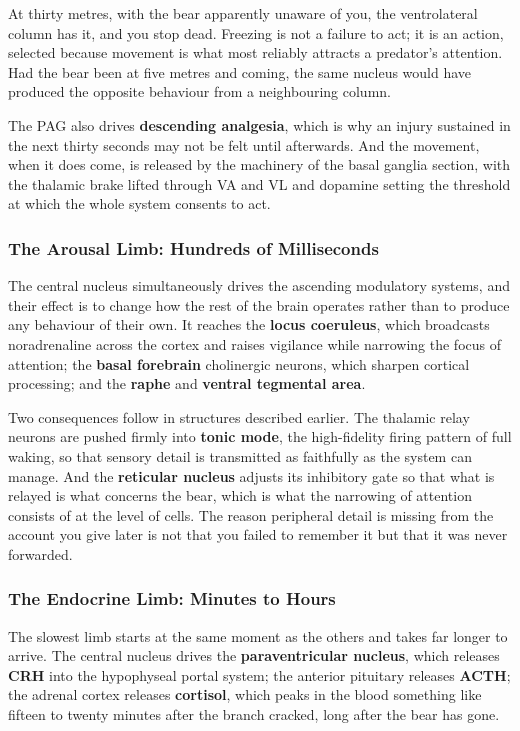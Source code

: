 \documentclass[11pt]{article}
\begin{document}
At thirty metres, with the bear apparently unaware of you, the ventrolateral column has it, and you stop dead. Freezing is not a failure to act; it is an action, selected because movement is what most reliably attracts a predator's attention. Had the bear been at five metres and coming, the same nucleus would have produced the opposite behaviour from a neighbouring column.

The PAG also drives \textbf{descending analgesia}, which is why an injury sustained in the next thirty seconds may not be felt until afterwards. And the movement, when it does come, is released by the machinery of the basal ganglia section, with the thalamic brake lifted through VA and VL and dopamine setting the threshold at which the whole system consents to act.

\subsubsection{The Arousal Limb: Hundreds of Milliseconds}

The central nucleus simultaneously drives the ascending modulatory systems, and their effect is to change how the rest of the brain operates rather than to produce any behaviour of their own. It reaches the \textbf{locus coeruleus}, which broadcasts noradrenaline across the cortex and raises vigilance while narrowing the focus of attention; the \textbf{basal forebrain} cholinergic neurons, which sharpen cortical processing; and the \textbf{raphe} and \textbf{ventral tegmental area}.

Two consequences follow in structures described earlier. The thalamic relay neurons are pushed firmly into \textbf{tonic mode}, the high-fidelity firing pattern of full waking, so that sensory detail is transmitted as faithfully as the system can manage. And the \textbf{reticular nucleus} adjusts its inhibitory gate so that what is relayed is what concerns the bear, which is what the narrowing of attention consists of at the level of cells. The reason peripheral detail is missing from the account you give later is not that you failed to remember it but that it was never forwarded.

\subsubsection{The Endocrine Limb: Minutes to Hours}

The slowest limb starts at the same moment as the others and takes far longer to arrive. The central nucleus drives the \textbf{paraventricular nucleus}, which releases \textbf{CRH} into the hypophyseal portal system; the anterior pituitary releases \textbf{ACTH}; the adrenal cortex releases \textbf{cortisol}, which peaks in the blood something like fifteen to twenty minutes after the branch cracked, long after the bear has gone.
\end{document}
